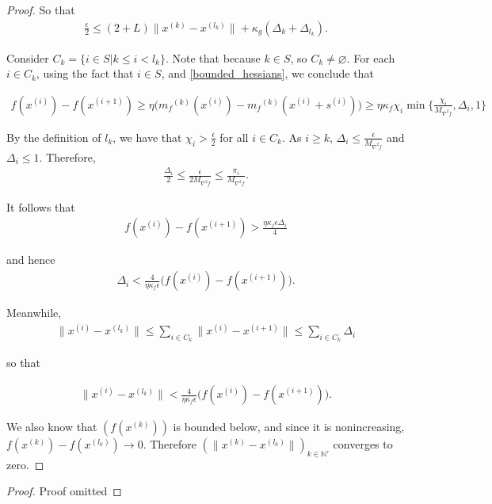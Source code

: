 \documentclass{article}
\theoremstyle{case}
\newcommand{\xk}{{x^{(k)}}}
\newcommand{\dk}{\Delta_k}
\newcommand{\mfk}{{{m}_f}^{(k)}}
\newcommand{\ints}{\mathbb N} %
\newcommand{\gk}{{\nabla m_f^{(k)}(x^{(k)})}}
\newcommand{\hfb}{{M_{\nabla^2 f}}}
\begin{document}
\begin{proof}

So that
\begin{align}
\frac{\epsilon} 2 \le (2 + L) \|\xk - x^{(l_k)}\| + \kappa_{g}(\dk + \Delta_{l_k}).
\end{align}

Consider $C_k = \{i \in S | k \le i < l_k\}$.
Note that because $k \in S$, so $C_k \ne \varnothing $.
For each $i \in C_k$, using the fact that $i \in S$, and \cref{bounded_hessians}, we conclude that 

\begin{align}
f(x^{(i)}) - f(x^{(i+1)}) \ge \eta\big ( \mfk(x^{(i)}) - \mfk(x^{(i)} + s^{(i)}) \big ) \ge \eta \kappa_f \chi_i \min\{\frac{\chi_{i}}{\hfb}, \Delta_i, 1\} 
\end{align}

By the definition of $l_k$, we have that $\chi_i > \frac{\epsilon}{2}$ for all $i \in C_k$.
As $i \ge k$, $\Delta_i \le \frac{\epsilon}{\hfb}$ and $\Delta_i \le 1$.
Therefore,
\begin{align}
\frac{\Delta_i}{2} \le \frac{\epsilon}{2 \hfb} \le \frac{\pi_i}{\hfb}.
\end{align}

It follows that
\begin{align}
f(x^{(i)}) - f(x^{(i+1)}) > \frac{\eta \kappa_f \epsilon \Delta_i}{4}
\end{align}

and hence
\begin{align}
\Delta_i < \frac{4}{\eta \kappa_f \epsilon} \big ( f(x^{(i)}) - f(x^{(i+1)})\big ).
\end{align}

Meanwhile,
\begin{align}
\|x^{(i)} - x^{(l_k)}\| \le \sum_{i \in C_k}\|x^{(i)} - x^{(i+1)}\| \le \sum_{i \in C_k} \Delta_i
\end{align}

so that

\begin{align}
\|x^{(i)} - x^{(l_k)}\| < \frac{4}{\eta \kappa_f \epsilon} \big ( f(x^{(i)}) - f(x^{(i+1)})\big ).
\end{align}

We also know that $(f(\xk))$ is bounded below, and since it is nonincreasing, $f(\xk)  - f(x^{(l_k)}) \to 0$.
Therefore $(\|\xk - x^{(l_k)}\|)_{k \in \ints '}$ converges to zero.
\end{proof}
\else
\begin{proof}
Proof omitted
\end{proof}
\fi
\end{document}
